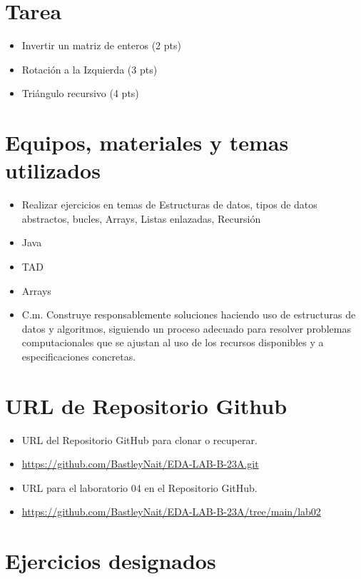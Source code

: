 \documentclass{article}
\begin{document}
	\section{Tarea}
	\begin{itemize}		
		\item Invertir un matriz de enteros (2 pts)
		\item Rotación a la Izquierda (3 pts)
		\item Triángulo recursivo (4 pts)
		
	\end{itemize}
		
	\section{Equipos, materiales y temas utilizados}
	\begin{itemize}
		\item Realizar ejercicios en temas de Estructuras de datos, tipos de datos abstractos, bucles, Arrays, Listas enlazadas, Recursión
		\item Java
		\item TAD
		\item Arrays
		\item C.m. Construye responsablemente soluciones haciendo uso de estructuras de datos y algoritmos, siguiendo un proceso adecuado para resolver problemas computacionales que se ajustan al uso de los recursos disponibles y a especificaciones concretas.
		
	\end{itemize}
	
	\section{URL de Repositorio Github}
	\begin{itemize}
		\item URL del Repositorio GitHub para clonar o recuperar.
		\item \url{https://github.com/BastleyNait/EDA-LAB-B-23A.git}
		\item URL para el laboratorio 04 en el Repositorio GitHub.
		\item \url{https://github.com/BastleyNait/EDA-LAB-B-23A/tree/main/lab02}
	\end{itemize}
	
	\section{Ejercicios designados}
\end{document}
